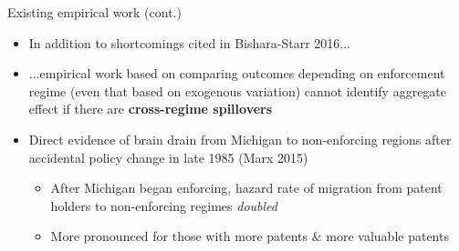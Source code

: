 \documentclass[english,usenames,dvipsnames]{beamer}
\begin{document}
\begin{frame}{Existing empirical work (cont.)}
\begin{itemize}	
	\item In addition to shortcomings cited in Bishara-Starr 2016...
	\item ...empirical work based on comparing outcomes depending on enforcement regime (even that based on exogenous variation) cannot identify aggregate effect if there are \textbf{cross-regime spillovers}
	\item Direct evidence of brain drain from Michigan to non-enforcing regions after accidental policy change in late 1985 (Marx 2015) 	
	\begin{itemize}
		\item After Michigan began enforcing, hazard rate of migration from patent holders to non-enforcing regimes \emph{doubled}
		\item More pronounced for those with more patents \& more valuable patents
	\end{itemize}
\end{itemize}
\end{frame}

\end{document}
